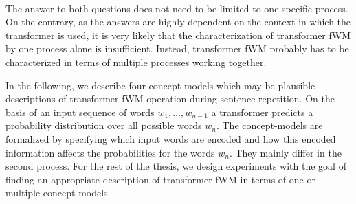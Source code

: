 \paragraph{} The answer to both questions does not need to be limited to one specific process.
On the contrary, as the answers are highly dependent on the context in which the transformer is used, it is very likely that the characterization of transformer fWM by one process alone is insufficient.
Instead, transformer fWM probably has to be characterized in terms of multiple processes working together.

In the following, we describe four concept-models which may be plausible descriptions of transformer fWM operation during sentence repetition.
On the basis of an input sequence of words $w_1, \dots, w_{n-1}$ a transformer predicts a probability distribution over all possible words $w_n$.
The concept-models are formalized by specifying which input words are encoded and how this encoded information affects the probabilities for the words $w_n$.
They mainly differ in the second process.
For the rest of the thesis, we design experiments with the goal of finding an appropriate description of transformer fWM in terms of one or multiple concept-models.

